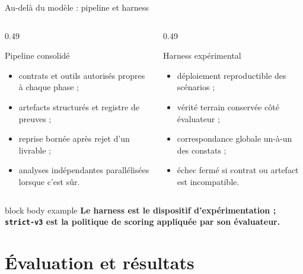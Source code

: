 \documentclass[aspectratio=169,10pt]{beamer}
\newcommand{\keymessage}[1]{%
  \begin{beamercolorbox}[rounded=true,sep=1.1ex,wd=\linewidth]{block body example}
    \centering\bfseries #1
  \end{beamercolorbox}
}
\begin{document}
\begin{frame}{Au-delà du modèle : pipeline et harness}
  \begin{columns}[T,onlytextwidth]
    \begin{column}{0.49\textwidth}
      \begin{block}{Pipeline consolidé}
        \begin{itemize}
          \item contrats et outils autorisés propres à chaque phase ;
          \item artefacts structurés et registre de preuves ;
          \item reprise bornée après rejet d'un livrable ;
          \item analyses indépendantes parallélisées lorsque c'est sûr.
        \end{itemize}
      \end{block}
    \end{column}
    \begin{column}{0.49\textwidth}
      \begin{exampleblock}{Harness expérimental}
        \begin{itemize}
          \item déploiement reproductible des scénarios ;
          \item vérité terrain conservée côté évaluateur ;
          \item correspondance globale un-à-un des constats ;
          \item échec fermé si contrat ou artefact est incompatible.
        \end{itemize}
      \end{exampleblock}
    \end{column}
  \end{columns}

  \vspace{0.7em}
  \keymessage{Le harness est le dispositif d'expérimentation ; \texttt{strict-v3} est la politique de scoring appliquée par son évaluateur.}
\end{frame}

\section{Évaluation et résultats}
\end{document}
